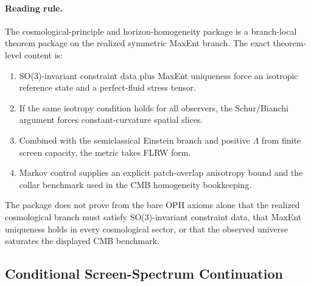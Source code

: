 \paragraph{\textbf{Reading rule.}}
The cosmological-principle and horizon-homogeneity package is a branch-local theorem package on the
realized symmetric MaxEnt branch. The exact theorem-level content is:
\begin{enumerate}[leftmargin=2em]
\item SO(3)-invariant constraint data plus MaxEnt uniqueness force an isotropic reference state and
      a perfect-fluid stress tensor.
\item If the same isotropy condition holds for all observers, the Schur/Bianchi argument forces
      constant-curvature spatial slices.
\item Combined with the semiclassical Einstein branch and positive \(\Lambda\) from finite screen
      capacity, the metric takes FLRW form.
\item Markov control supplies an explicit patch-overlap anisotropy bound and the collar benchmark
      used in the CMB homogeneity bookkeeping.
\end{enumerate}
The package does not prove from the bare OPH axioms alone that the realized cosmological branch
must satisfy SO(3)-invariant constraint data, that MaxEnt uniqueness holds in every cosmological
sector, or that the observed universe saturates the displayed CMB benchmark.

\subsection{Conditional Screen-Spectrum Continuation}

